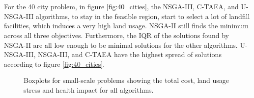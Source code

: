 \documentclass[mscthesis, 11pt]{usiinfthesis}
\theoremstyle{newdefinition}
\begin{document}
\\\\
For the 40 city problem, in figure \ref{fig:40_cities}, the NSGA-III, C-TAEA, and U-NSGA-III algorithms, to stay in the feasible region, start to select a lot of landfill facilities, which induces a very high land usage. NSGA-II still finds the minimum across all three objectives. Furthermore, the IQR of the solutions found by NSGA-II are all low enough to be minimal solutions for the other algorithms. U-NSGA-III, NSGA-III, and C-TAEA have the highest spread of solutions according to figure \ref{fig:40_cities}.


\begin{figure}[ht]
\centering
\noindent{}
\hfill
\noindent{}
\caption{Boxplots for small-scale problems showing the total cost, land usage stress and health impact for all algorithms.}
\label{fig:boxplot_2_to_5}
\end{figure}
\end{document}
